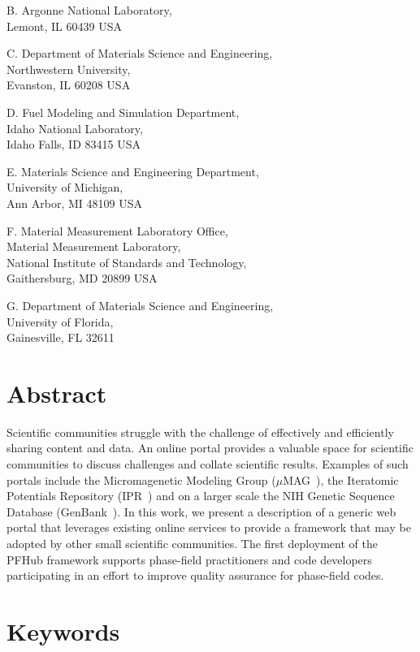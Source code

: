 \documentclass{jors}
\begin{document}
B. Argonne National Laboratory, \\
Lemont, IL 60439 USA

C. Department of Materials Science and Engineering, \\
Northwestern University, \\
Evanston, IL 60208 USA

D. Fuel Modeling and Simulation Department, \\
Idaho National Laboratory, \\
Idaho Falls, ID 83415 USA

E. Materials Science and Engineering Department, \\
University of Michigan, \\
Ann Arbor, MI 48109 USA

F. Material Measurement Laboratory Office, \\
Material Measurement Laboratory, \\
National Institute of Standards and Technology,\\
Gaithersburg, MD 20899 USA

G. Department of Materials Science and Engineering, \\
University of Florida, \\
Gainesville, FL 32611

\section*{Abstract}

Scientific communities struggle with the challenge of effectively and
efficiently sharing content and data. An online portal provides a
valuable space for scientific communities to discuss challenges and
collate scientific results. Examples of such portals include the
Micromagenetic Modeling Group ($\mu$MAG~\cite{mumag}), the Iteratomic
Potentials Repository (IPR~\cite{ipr1, ipr2}) and on a larger scale
the NIH Genetic Sequence Database (GenBank~\cite{genbank}). In this
work, we present a description of a generic web portal that leverages
existing online services to provide a framework that may be adopted by
other small scientific communities. The first deployment of the PFHub
framework supports phase-field practitioners and code developers
participating in an effort to improve quality assurance for
phase-field codes.

\section*{Keywords}
\end{document}
